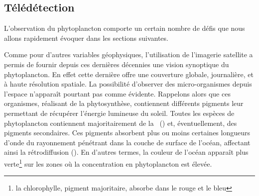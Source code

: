 \begin{figure}
  \centering
  \label{fig:pompe-bio}
\end{figure}

\subsection{Télédétection}
\label{sec:teledetection}

L'observation du phytoplancton comporte un certain nombre de défis que nous allons rapidement évoquer dans les sections suivantes.

Comme pour d'autres variables géophysiques, l'utilisation de l'imagerie satellite a permis de fournir depuis ces dernières décennies une vision synoptique du phytoplancton.
En effet cette dernière offre une couverture globale, journalière, et à haute résolution spatiale.
La possibilité d'observer des micro-organismes depuis l'espace n'apparaît pourtant pas comme évidente.
Rappelons alors que ces organismes, réalisant de la phytosynthèse, contiennent différents pigments leur permettant de récupérer l'énergie lumineuse du soleil.
Toutes les espèces de phytoplancton contiennent majoritairement de la ~() et, éventuellement, des pigments secondaires.
Ces pigments absorbent plus ou moins certaines longueurs d'onde du rayonnement pénétrant dans la couche de surface de l'océan, affectant ainsi la rétrodiffusion ().
En d'autres termes, la couleur de l'océan apparaît plus verte\footnote{%
  la chlorophylle, pigment majoritaire, absorbe dans le rouge et le bleu}
sur les zones où la concentration en phytoplancton est élevée.

